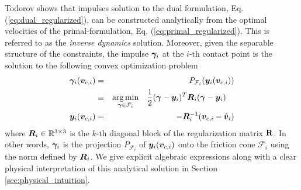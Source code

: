 Todorov \cite{bib:todorov2014} shows that impulses solution to the dual
formulation, Eq. (\ref{eq:dual_regularized}), can be constructed analytically
from the optimal velocities of the primal-formulation, Eq.
(\ref{eq:primal_regularized}). This is referred to as the \textit{inverse
dynamics} solution. Moreover, given the separable structure of the constraints,
the impulse ${\bm\gamma}_i$ at the $i\text{-th}$ contact point is the solution to
the following convex optimization problem
\begin{eqnarray}
	\bgamma_i(\vf{v}_{c,i})&=& P_{\mathcal{F}_i}(\vf{y}_i(\vf{v}_{c,i})) \nonumber\\
	&=&\begin{aligned}
		\argmin_{\bgamma\in\mathcal{F}_i} \quad &
	\frac{1}{2}(\bgamma-\vf{y}_i)^T\vf{R}_i(\bgamma-\vf{y}_i) \end{aligned}
    \label{eq:y_projection}\\
	\vf{y}_i(\vf{v}_{c,i}) &=& -\vf{R}_i^{-1}(\vf{v}_{c,i}-\hat{\vf{v}}_i)    
\end{eqnarray}
where ${\bm{R}}_i\in\mathbb{R}^{3\times3}$ is the $k\text{-th}$ diagonal block of
the regularization matrix ${\mathbf{R}}$. In other words, ${\bm\gamma}_i$ is the projection $P_{\mathcal{F}_i}$ of ${\bm{y}}_i({\bm{v}}_{c,i})$ onto
the friction cone $\mathcal{F}_i$ using the norm defined by ${\bm{R}}_i$. We give explicit algebraic expressions along with a clear physical interpretation of this analytical solution in Section \ref{sec:physical_intuition}.
